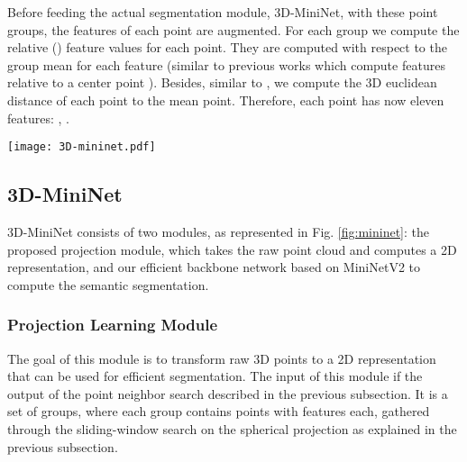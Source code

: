 \documentclass[letterpaper, 10 pt, journal, twoside]{IEEEtran}
\begin{document}
Before feeding the actual segmentation module, 3D-MiniNet, with these point groups, the features of each point are augmented.  For each group we compute the relative () feature values for each point. They are computed with respect to the group mean for each  feature (similar to previous works which compute features relative to a center point \cite{lunet, zhang2019shellnet}). Besides, similar to \cite{zhang2019rotation}, we compute the 3D euclidean distance of each point to the mean point. 
Therefore, each point has now eleven features: , .

  
   
\begin{figure*}[!tb]
\centering
\texttt{[image: 3D-mininet.pdf]}
\caption{3D-MiniNet overview. It takes  groups of  points each and computes semantic segmentation of the  points of the point cloud where .
It consists of two main modules: our proposed learning module (on the left) which learns a 2D tensor which is fed to the second module, an efficient FCNN backbone (on the right) which computes the 2D semantic segmentation. Each 3D point of the point cloud is given a semantic label based on the 2D segmentation. Best viewed in color.}
\label{fig:mininet}
\end{figure*} 
 
 
 \subsection{3D-MiniNet}
  \label{sec:3d-mininet}
 
 3D-MiniNet consists of two modules, as represented in Fig. \ref{fig:mininet}: the proposed projection module, which takes the raw point cloud and computes a 2D representation, and our efficient backbone network based on MiniNetV2 \cite{alonso2020MininetV2} to compute the semantic segmentation.
 
 \subsubsection{Projection Learning Module}
 \label{sec:projection_module}
 
The goal of this module is to transform raw 3D points to a 2D representation that can be used for efficient segmentation. The input of this module if the output of the point neighbor search described in the previous subsection. It is a set of  groups, where each group contains  points with  features each, gathered through the sliding-window search on the spherical projection as explained in the previous subsection. 
\end{document}
